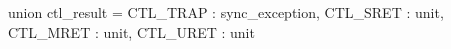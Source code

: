 union ctl_result = {
  CTL_TRAP : sync_exception,
  CTL_SRET : unit,
  CTL_MRET : unit,
  CTL_URET : unit
}
